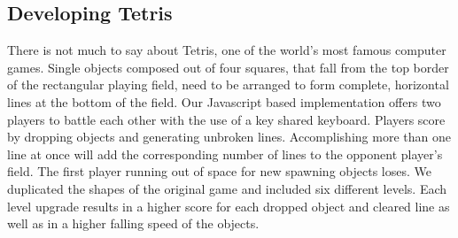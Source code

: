\subsection{Developing Tetris}
There is not much to say about Tetris, one of the world's most famous computer games. Single objects composed out of four
squares, that fall from the top border of the rectangular playing field, need to be arranged to form complete,
horizontal lines at the bottom of the field.
Our Javascript based implementation offers two players to battle each other with the use of a key shared keyboard.
Players score by dropping objects and generating unbroken lines. Accomplishing more than one line at once will
add the corresponding number of lines to the opponent player's field.
The first player running out of space for new spawning objects loses.
We duplicated the shapes of the original game and included six different levels.
Each level upgrade results in a higher score for each dropped object and cleared line as well as in a higher falling speed of the objects.

